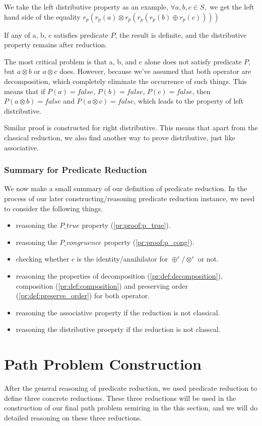 \documentclass[a4paper,12pt,twoside,openright]{report}
\begin{document}
We take the left distributive property as an example, $\forall a,b,c \in S,$ we get the left hand side of the equality $r_p(r_p(a) \otimes r_p(r_p(r_p(b) \oplus r_p(c))))$

If any of a, b, c satisfies predicate $P$, the result is definite, and the distributive property remains after reduction.

The most critical problem is that a, b, and c alone does not satisfy predicate $P$, but $a \otimes b$ or $a \otimes c$ does. However, because we've assumed that both operator are decomposition, which completely eliminate the occurrence of such things. This means that if $P(a) = false$, $P(b) = false$, $P(c) = false$, then $P(a \otimes b) = false$ and $P(a \otimes c) = false$, which leads to the property of left distributive.

Similar proof is constructed for right distributive. This means that apart from the classical reduction, we also find another way to prove distributive, just like associative.

\subsubsection{Summary for Predicate Reduction}
We now make a small summary of our definition of predicate reduction. 
In the process of our later constructing/reasoning predicate reduction instance, we need to consider the following things.
\begin{itemize}
  \item reasoning the $P\_true$ property (\ref{pr:proof:p_true}).
  \item reasoning the $P\_congruence$ property (\ref{pr:proof:p_cong}).
  \item checking whether $c$ is the identity/annihilator for $\oplus^r$/$\otimes^r$ or not.
  \item reasoning the properties of decomposition (\ref{pr:def:decomposition}), composition (\ref{pr:def:composition}) and preserving order (\ref{pr:def:preserve_order}) for both operator.
  \item reasoning the associative property if the reduction is not classical.
  \item reasoning the distributive proeprty if the reduction is not classcal.
\end{itemize}

\section{Path Problem Construction}
After the general reasoning of predicate reduction, we used predicate reduction to define three concrete reductions. These three reductions will be used in the construction of our final path problem semiring in the this section, and we will do detailed reasoning on these three reductions. 
\end{document}
